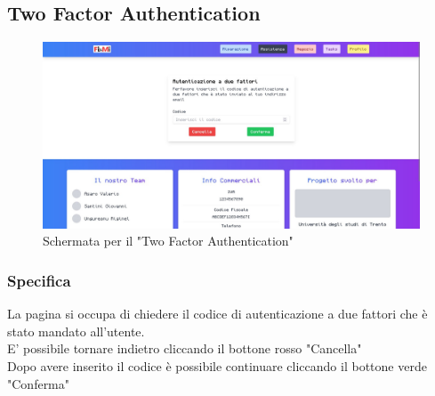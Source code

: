 \documentclass{report}
\begin{document}
\subsection{Two Factor Authentication}

\begin{figure}[H]
	\centering\includegraphics[width=1\textwidth]{images/microservizio-autenticazione/frontend/twofa.jpg}
	Schermata per il "Two Factor Authentication"
\end{figure}
\subsubsection*{Specifica}
La pagina si occupa di chiedere il codice di autenticazione a due fattori che è stato mandato all'utente.\\
E' possibile tornare indietro cliccando il bottone rosso "Cancella"\\
Dopo avere inserito il codice è possibile continuare cliccando il bottone verde "Conferma"
\end{document}

